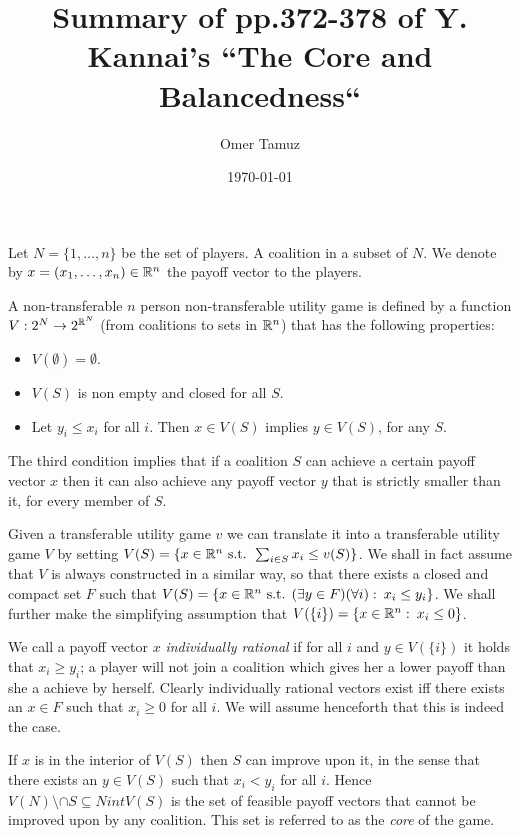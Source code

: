 \documentclass[11pt]{article} \usepackage{amssymb}
\begin{document}
\title{Summary of pp.372-378 of Y. Kannai's ``The Core and
  Balancedness``}

\author{Omer Tamuz}
\date{\today}

\maketitle

Let $N=\{1,\ldots,n\}$ be the set of players. A coalition in a subset
of $N$. We denote by $x=(x_1,\ldots,x_n) \in \mathbb R^n$ the payoff vector
to the players.

A non-transferable $n$ person non-transferable utility game is defined
by a function $V:2^N \to 2^{\mathbb R^N}$ (from coalitions to sets in $\mathbb R^n$)
that has the following properties:
\begin{itemize}
\item $V(\emptyset) = \emptyset$.
\item $V(S)$ is non empty and closed for all $S$.
\item Let $y_i \leq x_i$ for all $i$. Then $x \in V(S)$ implies $y \in
  V(S)$, for any $S$.
\end{itemize}
The third condition implies that if a coalition $S$ can achieve a certain
payoff vector $x$ then it can also achieve any payoff vector $y$ that
is strictly smaller than it, for every member of $S$.

Given a transferable utility game $v$ we can translate it into a
transferable utility game $V$ by setting $V(S)=\{x \in \mathbb R^n \mbox{
  s.t. } \sum_{i \in S}x_i \leq v(S)\}$. We shall in fact assume that
$V$ is always constructed in a similar way, so that there exists a
closed and compact set $F$ such that $V(S)=\{x \in \mathbb R^n \mbox{
  s.t. } (\exists y \in F)(\forall i):\:x_i \leq y_i\}$. We shall
further make the simplifying assumption that $V(\{i\}) = \{x \in \mathbb R^n
:\: x_i \leq 0\}$.

We call a payoff vector $x$ {\em individually rational} if for all $i$
and $y \in V(\{i\})$ it holds that $x_i \geq y_i$; a player will not
join a coalition which gives her a lower payoff than she a achieve by
herself. Clearly individually rational vectors exist iff there exists
an $x \in F$ such that $x_i \geq 0$ for all $i$. We will assume
henceforth that this is indeed the case.

If $x$ is in the interior of $V(S)$ then $S$ can improve upon it, in
the sense that there exists an $y \in V(S)$ such that $x_i < y_i$ for
all $i$. Hence $V(N) \setminus \cap{S \subseteq N} int V(S)$ is the
set of feasible payoff vectors that cannot be improved upon by any
coalition. This set is referred to as the {\em core} of the game.
\end{document}
